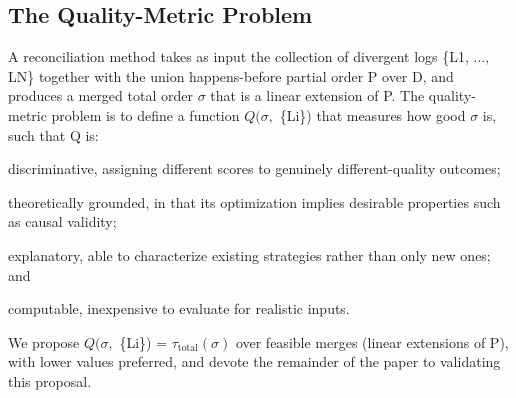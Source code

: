 \documentclass[11pt]{article}
\begin{document}
\begin{table}[t]
\centering
\caption{Table 2. Notation used throughout the paper.}
\label{tbl:2}
\end{table}

\subsection{The Quality-Metric Problem}
A reconciliation method takes as input the collection of divergent logs \{L1, $\ldots ,$ LN\} together with the union happens-before partial order P over D, and produces a merged total order $\sigma $ that is a linear extension of P. The quality-metric problem is to define a function $Q(\sigma ,$ \{Li\}) that measures how good $\sigma $ is, such that Q is:

discriminative, assigning different scores to genuinely different-quality outcomes;

theoretically grounded, in that its optimization implies desirable properties such as causal validity;

explanatory, able to characterize existing strategies rather than only new ones; and

computable, inexpensive to evaluate for realistic inputs.

We propose $Q(\sigma ,$ \{Li\}) = $\tau _{\mathrm{total}}(\sigma )$ over feasible merges (linear extensions of P), with lower values preferred, and devote the remainder of the paper to validating this proposal.
\end{document}
